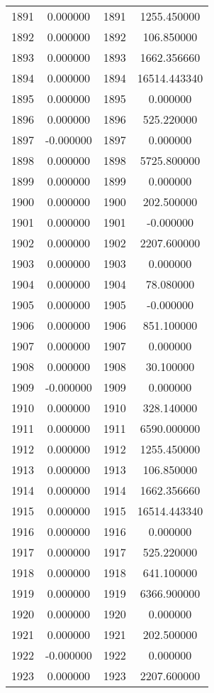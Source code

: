 \documentclass[12pt]{article}
\begin{document}
\begin{longtable}{@{}cccc@{}}
1891 & 0.000000 & 1891 & 1255.450000 \\
1892 & 0.000000 & 1892 & 106.850000 \\
1893 & 0.000000 & 1893 & 1662.356660 \\
1894 & 0.000000 & 1894 & 16514.443340 \\
1895 & 0.000000 & 1895 & 0.000000 \\
1896 & 0.000000 & 1896 & 525.220000 \\
1897 & -0.000000 & 1897 & 0.000000 \\
1898 & 0.000000 & 1898 & 5725.800000 \\
1899 & 0.000000 & 1899 & 0.000000 \\
1900 & 0.000000 & 1900 & 202.500000 \\
1901 & 0.000000 & 1901 & -0.000000 \\
1902 & 0.000000 & 1902 & 2207.600000 \\
1903 & 0.000000 & 1903 & 0.000000 \\
1904 & 0.000000 & 1904 & 78.080000 \\
1905 & 0.000000 & 1905 & -0.000000 \\
1906 & 0.000000 & 1906 & 851.100000 \\
1907 & 0.000000 & 1907 & 0.000000 \\
1908 & 0.000000 & 1908 & 30.100000 \\
1909 & -0.000000 & 1909 & 0.000000 \\
1910 & 0.000000 & 1910 & 328.140000 \\
1911 & 0.000000 & 1911 & 6590.000000 \\
1912 & 0.000000 & 1912 & 1255.450000 \\
1913 & 0.000000 & 1913 & 106.850000 \\
1914 & 0.000000 & 1914 & 1662.356660 \\
1915 & 0.000000 & 1915 & 16514.443340 \\
1916 & 0.000000 & 1916 & 0.000000 \\
1917 & 0.000000 & 1917 & 525.220000 \\
1918 & 0.000000 & 1918 & 641.100000 \\
1919 & 0.000000 & 1919 & 6366.900000 \\
1920 & 0.000000 & 1920 & 0.000000 \\
1921 & 0.000000 & 1921 & 202.500000 \\
1922 & -0.000000 & 1922 & 0.000000 \\
1923 & 0.000000 & 1923 & 2207.600000 \\

\end{longtable}
\end{document}
